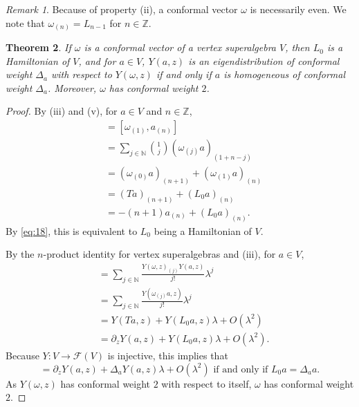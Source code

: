 \documentclass[a4paper, 12pt, reqno]{amsart}
\newtheorem{theorem}{Theorem}[section]
\theoremstyle{remark}
\newtheorem{remark}[theorem]{Remark}
\numberwithin{equation}{subsection}
\begin{document}
\begin{remark}
  \label{rmk:19}
  Because of property (ii), a conformal vector $\omega$ is necessarily even.
  We note that $\omega_{(n)} = L_{n - 1}$ for $n \in \mathbb{Z}$.
\end{remark}

\begin{theorem}
  \label{thr:21}
  If $\omega$ is a conformal vector of a vertex superalgebra $V$, then $L_0$ is a Hamiltonian of $V$, and for $a \in V$, $Y(a, z)$ is an eigendistribution of conformal weight $\Delta_a$ with respect to $Y(\omega, z)$ if and only if $a$ is homogeneous of conformal weight $\Delta_a$.
  Moreover, $\omega$ has conformal weight $2$.
\end{theorem}

\begin{proof}
  By (iii) and (v), for $a \in V$ and $n \in \mathbb{Z}$,
  \begin{align*}
    [L_0, a_{(n)}] &= [\omega_{(1)}, a_{(n)}] \\
    &= \sum_{j \in \mathbb{N}}\binom{1}{j}(\omega_{(j)}a)_{(1 + n - j)} \\
    &= (\omega_{(0)}a)_{(n + 1)} + (\omega_{(1)}a)_{(n)} \\
    &= (Ta)_{(n + 1)} + (L_0a)_{(n)} \\
    &= -(n + 1)a_{(n)} + (L_0a)_{(n)}.
  \end{align*}
  By \eqref{eq:18}, this is equivalent to $L_0$ being a Hamiltonian of $V$.

  By the $n$-product identity for vertex superalgebras and (iii), for $a \in V$,
  \begin{align*}
    [Y(\omega, z)_{\lambda}Y(a, z)] &= \sum_{j \in \mathbb{N}}\frac{Y(\omega, z)_{(j)}Y(a, z)}{j!}\lambda^j \\
    &= \sum_{j \in \mathbb{N}}\frac{Y(\omega_{(j)}a, z)}{j!}\lambda^j \\
    &= Y(Ta, z) + Y(L_0a, z)\lambda + O(\lambda^2) \\
    &= \partial_zY(a, z) + Y(L_0a, z)\lambda + O(\lambda^2).
  \end{align*}
  Because $Y: V \to \mathcal{F}(V)$ is injective, this implies that
  \begin{equation*}
    [Y(\omega, z)_{\lambda}Y(a, z)] = \partial_zY(a, z) + \Delta_aY(a, z)\lambda + O(\lambda^2)\text{ if and only if }L_0a = \Delta_aa.
  \end{equation*}
  As $Y(\omega, z)$ has conformal weight $2$ with respect to itself, $\omega$ has conformal weight $2$.
\end{proof}
\end{document}
